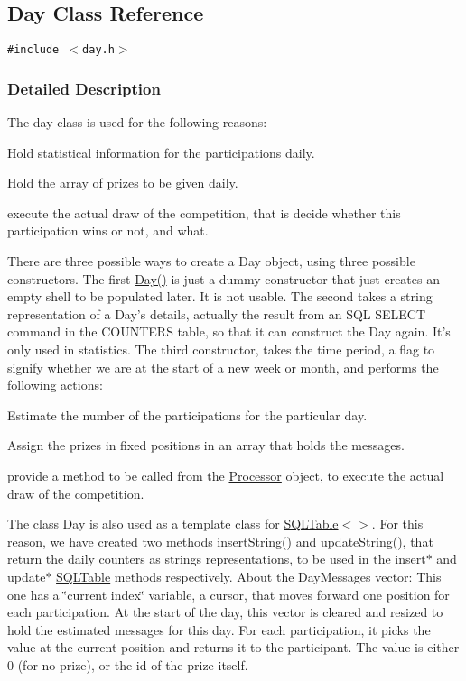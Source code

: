 \hypertarget{classDay}{
\subsection{Day Class Reference}
\label{classDay}
}
{\tt \#include $<$day.h$>$}



\subsubsection{Detailed Description}
The day class is used for the following reasons:\begin{CompactItemize}
\item 
Hold statistical information for the participations daily.\item 
Hold the array of prizes to be given daily.\item 
execute the actual draw of the competition, that is decide whether this participation wins or not, and what.\par
 There are three possible ways to create a Day object, using three possible constructors. The first \hyperlink{classDay_Daya2}{Day()} is just a dummy constructor that just creates an empty shell to be populated later. It is not usable. The second takes a string representation of a Day's details, actually the result from an SQL SELECT command in the COUNTERS table, so that it can construct the Day again. It's only used in statistics. The third constructor, takes the time period, a flag to signify whether we are at the start of a new week or month, and performs the following actions:\item 
Estimate the number of the participations for the particular day.\item 
Assign the prizes in fixed positions in an array that holds the messages.\item 
provide a method to be called from the \hyperlink{classProcessor}{Processor} object, to execute the actual draw of the competition.\par
 The class Day is also used as a template class for \hyperlink{classSQLTable}{SQLTable}$<$$>$. For this reason, we have created two methods \hyperlink{classDay_Daya13}{insert\-String()} and \hyperlink{classDay_Daya14}{update\-String()}, that return the daily counters as strings representations, to be used in the insert$\ast$ and update$\ast$ \hyperlink{classSQLTable}{SQLTable} methods respectively. About the Day\-Messages vector: This one has a \char`\"{}current index\char`\"{} variable, a cursor, that moves forward one position for each participation. At the start of the day, this vector is cleared and resized to hold the estimated messages for this day. For each participation, it picks the value at the current position and returns it to the participant. The value is either 0 (for no prize), or the id of the prize itself. \end{CompactItemize}




